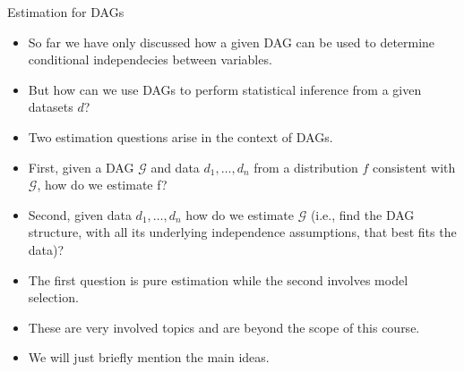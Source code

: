 \documentclass[handout]{beamer}
\begin{document}
\begin{frame}{Estimation for DAGs}
\scriptsize{
\begin{itemize}
\item So far we have only discussed how a given DAG can be used to determine conditional independecies between variables.

\item But how can we use DAGs to perform statistical inference from a given datasets $d$?

\item Two estimation questions arise in the context of DAGs. 
\item First, given a DAG $\mathcal{G}$ and data $d_1,\dots,d_n$ from a distribution $f$ consistent with $\mathcal{G}$, how do we estimate f?

\item Second, given data $d_1,\dots,d_n$ how do we estimate $\mathcal{G}$ (i.e., find the DAG structure, with all its underlying independence assumptions, that best fits the data)?

\item The first question is pure estimation while the second involves model selection.

\item These are very involved topics and are beyond the scope of this course.

\item We will just briefly mention the main ideas.

 
\end{itemize}



} 

\end{frame}
\end{document}
